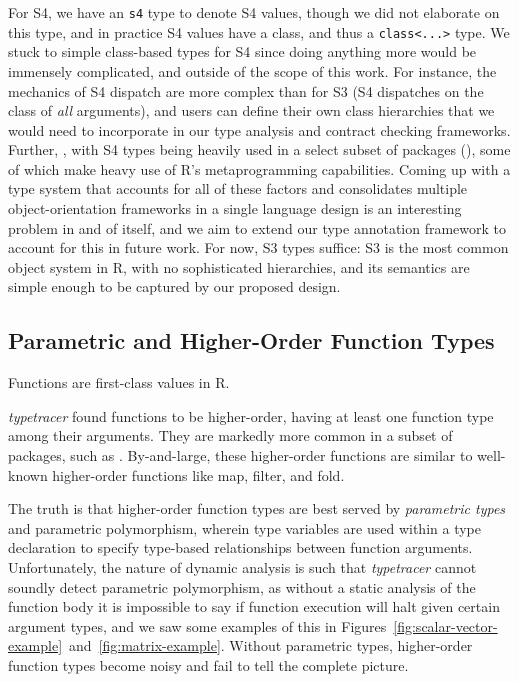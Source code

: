 \documentclass[acmsmall,review,anonymous]{acmart}\settopmatter{printfolios=true,printccs=false,printacmref=false}
\newcommand{\code}[1]{{\lstinline[style=Rin]!#1!}\xspace}
\newcommand{\typetracer}{\emph{typetracer}\xspace} %
\begin{document}
For S4, we have an \code{s4} type to denote S4 values, though we did not elaborate on this type, and in practice S4 values have a class, and thus a \code{class<...>} type.  
We stuck to simple class-based types for S4 since doing anything more would be immensely complicated, and outside of the scope of this work.
For instance, the mechanics of S4 dispatch are more complex than for S3 (S4 dispatches on the class of {\it all} arguments), and users can define their own class hierarchies that we would need to incorporate in our type analysis and contract checking frameworks.  
Further, , with S4 types being heavily used in a select subset of packages (), some of which make heavy use of R's metaprogramming capabilities.  
Coming up with a type system that accounts for all of these factors and consolidates multiple object-orientation frameworks in a single language design is an interesting problem in and of itself, and we aim to extend our type annotation framework to account for this in future work.  
For now, S3 types suffice: S3 is the most common object system in R, with no sophisticated hierarchies, and its semantics are simple enough to be captured by our proposed design.

%
%
%
%
\subsection{Parametric and Higher-Order Function Types}

Functions are first-class values in R.

\typetracer found  functions to be higher-order, having at least one function type among their arguments.
They are markedly more common in a subset of packages, such as .
By-and-large, these higher-order functions are similar to well-known higher-order functions like map, filter, and fold.

The truth is that higher-order function types are best served by {\it parametric types} and parametric polymorphism, wherein type variables are used within a type declaration to specify type-based relationships between function arguments.
Unfortunately, the nature of dynamic analysis is such that \typetracer cannot soundly detect parametric polymorphism, as without a static analysis of the function body it is impossible to say if function execution will halt given certain argument types, and we saw some examples of this in Figures~\ref{fig:scalar-vector-example}~and~\ref{fig:matrix-example}.
Without parametric types, higher-order function types become noisy and fail to tell the complete picture.
\end{document}
